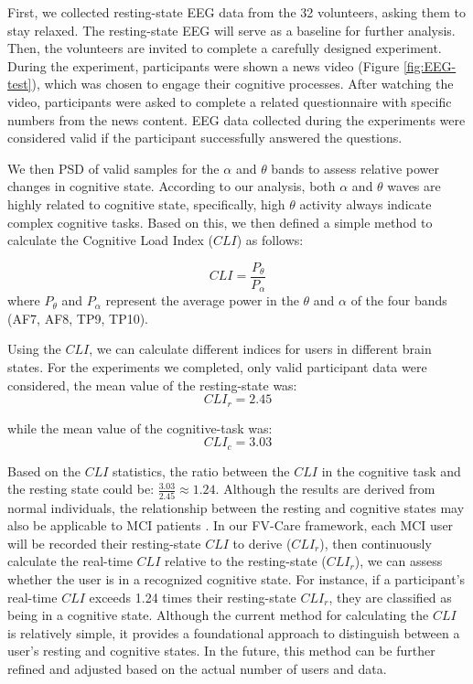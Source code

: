 \documentclass[conference]{IEEEtran}
\begin{document}
First, we  collected resting-state EEG data from the 32 volunteers, asking them to stay relaxed. The resting-state EEG will serve as a baseline for further analysis. Then, the volunteers are invited to complete a carefully designed experiment. During the experiment, participants were shown a news video (Figure \ref{fig:EEG-test}), which was chosen to engage their cognitive processes. After watching the video, participants were asked to complete a related questionnaire with specific numbers from the news content. EEG data collected during the experiments were considered valid if the participant successfully answered the questions.

We then PSD of valid samples for the $\alpha$ and $\theta$ bands to assess relative power changes in cognitive state. According to our analysis, both $\alpha$ and $\theta$ waves are highly related to cognitive state, specifically, high $\theta$ activity always indicate complex cognitive tasks. Based on this, we then defined a simple method to calculate the Cognitive Load Index ($CLI$) as follows:



\begin{equation}
CLI = \frac{P_\theta}{P_\alpha}
\end{equation}
where $P_\theta$ and $P_\alpha$ represent the average power in the $\theta$ and $\alpha$ of the four bands (AF7, AF8, TP9, TP10). 

Using the $CLI$, we can calculate different indices for users in different brain states. For the experiments we completed, only valid participant data were considered, the mean value of the resting-state  was:
\[
CLI_r = 2.45
\]

while the mean value of the cognitive-task was:
\[
CLI_c = 3.03
\]



Based on the $CLI$ statistics, the ratio between the $CLI$ in the cognitive task and the resting state could be: $\frac{3.03}{2.45} \approx 1.24$. Although the results are derived from normal individuals, the relationship between the resting and cognitive states may also be applicable to MCI patients \cite{schumacher2020quantitative}. In our FV-Care framework, each MCI user will be  recorded their resting-state $CLI$ to derive ($CLI_r$), then continuously calculate the real-time $CLI$ relative to the resting-state ($CLI_r$), we can assess whether the user is in a recognized cognitive state. For instance, if a participant's real-time $CLI$ exceeds 1.24 times their resting-state $CLI_r$, they are classified as being in a cognitive state. Although the current method for calculating the $CLI$ is relatively simple, it provides a foundational approach to distinguish between a user's resting and cognitive states. In the future, this method can be further refined and adjusted based on the actual number of users and data.
\end{document}
